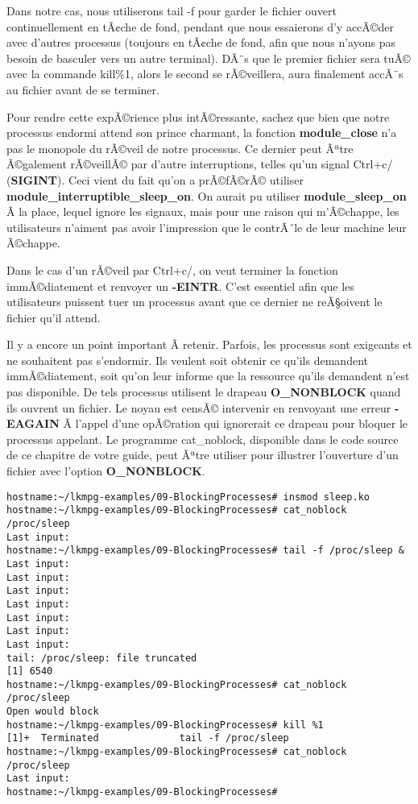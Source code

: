 \documentclass[11pt]{article}
\begin{document}
Dans notre cas, nous utiliserons tail -f pour garder le fichier ouvert continuellement en tÃ¢che de fond, pendant que nous essaierons d'y accÃ©der avec d'autres processus (toujours en tÃ¢che de fond, afin que nous n'ayons pas besoin de basculer vers un autre terminal). DÃ¨s que le premier fichier sera tuÃ© avec la commande kill\%1, alors le second se rÃ©veillera, aura finalement accÃ¨s au fichier avant de se terminer.

Pour rendre cette expÃ©rience plus intÃ©ressante, sachez que bien que notre processus endormi attend son prince charmant, la fonction \textbf{module\_close} n'a pas le monopole du rÃ©veil de notre processus. Ce dernier peut Ãªtre Ã©galement rÃ©veillÃ© par d'autre interruptions, telles qu'un signal Ctrl+c/ (\textbf{SIGINT}). Ceci vient du fait qu'on a prÃ©fÃ©rÃ© utiliser \textbf{module\_interruptible\_sleep\_on}. On aurait pu utiliser \textbf{module\_sleep\_on} Ã  la place, lequel ignore les signaux, mais pour une raison qui m'Ã©chappe, les utilisateurs n'aiment pas avoir l'impression que le contrÃ´le de leur machine leur Ã©chappe.

Dans le cas d'un rÃ©veil par Ctrl+c/, on veut terminer la fonction immÃ©diatement et renvoyer un \textbf{-EINTR}. C'est essentiel afin que les utilisateurs puissent tuer un processus avant que ce dernier ne reÃ§oivent le fichier qu'il attend.

Il y a encore un point important Ã  retenir. Parfois, les processus sont exigeants et ne souhaitent pas s'endormir. Ils veulent soit obtenir ce qu'ils demandent immÃ©diatement, soit qu'on leur informe que la ressource qu'ils demandent n'est pas disponible. De tels processus utilisent le drapeau \textbf{O\_NONBLOCK} quand ils ouvrent un fichier. Le noyau est censÃ© intervenir en renvoyant une erreur \textbf{-EAGAIN} Ã  l'appel d'une opÃ©ration qui ignorerait ce drapeau pour bloquer le processus appelant. Le programme cat\_noblock, disponible dans le code source de ce chapitre de votre guide, peut Ãªtre utiliser pour illustrer l'ouverture d'un fichier avec l'option \textbf{O\_NONBLOCK}.

\begin{verbatim}
hostname:~/lkmpg-examples/09-BlockingProcesses# insmod sleep.ko
hostname:~/lkmpg-examples/09-BlockingProcesses# cat_noblock /proc/sleep
Last input:
hostname:~/lkmpg-examples/09-BlockingProcesses# tail -f /proc/sleep &
Last input:
Last input:
Last input:
Last input:
Last input:
Last input:
Last input:
tail: /proc/sleep: file truncated
[1] 6540
hostname:~/lkmpg-examples/09-BlockingProcesses# cat_noblock /proc/sleep
Open would block
hostname:~/lkmpg-examples/09-BlockingProcesses# kill %1
[1]+  Terminated              tail -f /proc/sleep
hostname:~/lkmpg-examples/09-BlockingProcesses# cat_noblock /proc/sleep
Last input:
hostname:~/lkmpg-examples/09-BlockingProcesses#
\end{verbatim}
\end{document}
